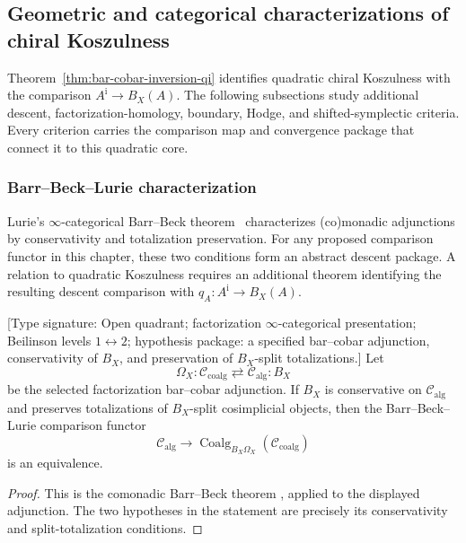 \subsection{Geometric and categorical characterizations of chiral Koszulness}
\label{subsec:geometric-categorical-koszulness}

Theorem~\ref{thm:bar-cobar-inversion-qi} identifies quadratic chiral
Koszulness with the comparison
\(A^{\mathrm i}\to B_X(A)\).  The following subsections study
additional descent, factorization-homology, boundary, Hodge, and
shifted-symplectic criteria.  Every criterion carries the comparison
map and convergence package that connect it to this quadratic core.

\medskip

\subsubsection{Barr--Beck--Lurie characterization}

Lurie's $\infty$-categorical Barr--Beck theorem~\cite[Theorem~4.7.3.5]{HA}
characterizes (co)monadic adjunctions by conservativity and totalization
preservation.  For any proposed comparison functor in this chapter,
these two conditions form an abstract descent package.  A relation to
quadratic Koszulness requires an additional theorem identifying the
resulting descent comparison with
$q_A\colon A^{\mathrm i}\to B_X(A)$.

\begin{theorem}
\label{thm:barr-beck-lurie-koszulness}
\textup{[Type signature: Open quadrant; factorization
\(\infty\)-categorical presentation; Beilinson levels
\(1\leftrightarrow2\); hypothesis package: a specified
bar--cobar adjunction, conservativity of \(B_X\), and preservation of
\(B_X\)-split totalizations.]}
Let
\[
\Omega_X\colon\mathcal C_{\mathrm{coalg}}
\rightleftarrows
\mathcal C_{\mathrm{alg}}\colon B_X
\]
be the selected factorization bar--cobar adjunction.  If \(B_X\) is
conservative on \(\mathcal C_{\mathrm{alg}}\) and preserves
totalizations of \(B_X\)-split cosimplicial objects, then the
Barr--Beck--Lurie comparison functor
\[
\mathcal C_{\mathrm{alg}}
\longrightarrow
\operatorname{Coalg}_{B_X\Omega_X}
(\mathcal C_{\mathrm{coalg}})
\]
is an equivalence.
\end{theorem}

\begin{proof}
This is the comonadic Barr--Beck theorem
\cite[Theorem~4.7.3.5]{HA}, applied to the displayed adjunction.
The two hypotheses in the statement are precisely its
conservativity and split-totalization conditions.
\end{proof}

